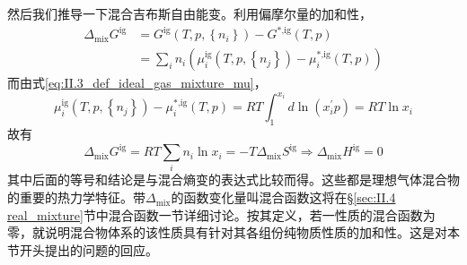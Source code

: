 \documentclass[main.tex]{subfiles}
\begin{document}
然后我们推导一下混合吉布斯自由能变。利用偏摩尔量的加和性，
\begin{align*}
    \Delta_\text{mix}G^\text{ig} & =G^\text{ig}\left(T,p,\left\{n_i\right\}\right)-G^\text{*,ig}\left(T,p\right)                               \\
                                 & =\sum_in_i\left(\mu_i^\text{ig}\left(T,p,\left\{n_j\right\}\right)-\mu_i^\text{*,ig}\left(T,p\right)\right)
\end{align*}
而由式\eqref{eq:II.3_def_ideal_gas_mixture_mu}，
\[\mu_i^\text{ig}\left(T,p,\left\{n_j\right\}\right)-\mu_i^\text{*,ig}\left(T,p\right)=RT\int_{1}^{x_i}d\ln\left(x_i^\prime p\right)=RT\ln x_i\]
故有
\[\Delta_\text{mix}G^\text{ig}=RT\sum_in_i\ln x_i=-T\Delta_\text{mix}S^\text{ig}\Rightarrow\Delta_\text{mix}H^\text{ig}=0\]
其中后面的等号和结论是与混合熵变的表达式比较而得。这些都是理想气体混合物的重要的热力学特征。带$\Delta_\text{mix}$的函数变化量叫混合函数这将在\S\ref{sec:II.4 real_mixture}节中混合函数一节详细讨论。按其定义，若一性质的混合函数为零，就说明混合物体系的该性质具有针对其各组份纯物质性质的加和性。这是对本节开头提出的问题的回应。
\end{document}

